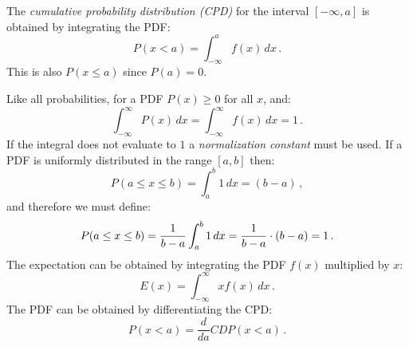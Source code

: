 The \emph{cumulative probability distribution (CPD)} for the interval $[-\infty,a]$ is obtained by integrating the PDF:
\[
P(x<a) = \int_{-\infty}^{a} f(x)\, dx\,.
\]
This is also $P(x\leq a)$ since $P(a)=0$.

Like all probabilities, for a PDF $P(x)\geq 0$ for all $x$, and:
\[
\int_{-\infty}^{\infty} P(x)\, dx=\int_{-\infty}^{\infty} f(x)\, dx=1\,.
\]
If the integral does not evaluate to $1$ a \emph{normalization constant} must be used. If a PDF is uniformly distributed in the range $[a,b]$ then:
\[
P(a\leq x \leq b)=\int_{a}^{b} 1\, dx=(b-a)\,,
\]
and therefore we must define:
\[
P(a\leq x \leq b)=\displaystyle\frac{1}{b-a}\int_{a}^{b} 1\, dx=\displaystyle\frac{1}{b-a}\cdot (b-a)=1\,.
\]
The expectation can be obtained by integrating the PDF $f(x)$ multiplied by $x$:
\[
E(x)=\int_{-\infty}^{\infty} xf(x)\, dx\,.
\]
The PDF can be obtained by differentiating the CPD:
\[
P(x<a)= \frac{d}{da}\mathit{CDP}(x<a)\,.
\]

